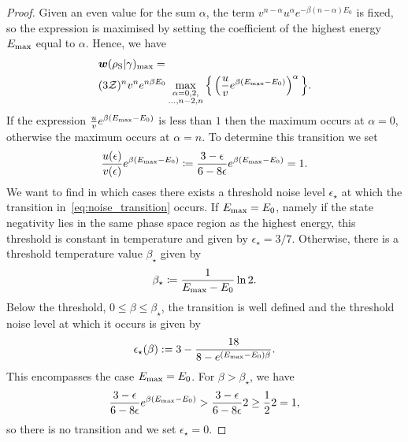 \documentclass[pra,
aps,
twocolumn,
superscriptaddress,
groupedaddress,
nofootinbib,
reprint
]{revtex4-1}
\begin{document}
\begin{proof}
Given an even value for the sum $\alpha$, the term $v^{n-\alpha} u^{\alpha} e^{-\beta (n-\alpha)E_0}$ is fixed, so the expression is maximised by setting the coefficient of the highest energy $E_{\rm{max}}$ equal to $\alpha$.
Hence, we have
\begin{align}
	&\bm{w}(\rho_{\rm{S}} | \gamma)_{\rm{max}} = \nonumber\\
	&(3\mathcal{Z})^{n} v^n e^{n\beta E_0}\max\limits_{\substack{\alpha = 0,2, \\ \dots,n-2,n}}{\Big\{ \left( \frac{u}{v} e^{\beta (E_{\rm{max}} - E_0)} \right)^{\alpha} \Big\}}.
\end{align}
If the expression $\frac{u}{v} e^{\beta (E_{\rm{max}} - E_0)}$ is less than $1$ then the maximum occurs at $\alpha=0$, otherwise the maximum occurs at $\alpha = n$. To determine this transition we set
\begin{equation}\label{eq:noise_transition}
	\frac{u(\epsilon)}{v(\epsilon)} e^{\beta (E_{\rm{max}} - E_0)} \coloneqq \frac{3-\epsilon}{6-8\epsilon} e^{\beta (E_{\rm{max}} - E_0)} = 1.
\end{equation}
We want to find in which cases there exists a threshold noise level $\epsilon_\star$ at which the transition in~\cref{eq:noise_transition} occurs.
If $E_{\rm{max}} = E_0$, namely if the state negativity lies in the same phase space region as the highest energy, this threshold is constant in temperature and given by $\epsilon_{\star} = 3/7$. 
Otherwise, there is a threshold temperature value $\beta_\star$ given by
\begin{equation}
	\beta_{\star} \coloneqq \frac{1}{E_{\rm{max}} - E_0} \ln2.
\end{equation}
Below the threshold, $0 \leq \beta \leq \beta_\star$, the transition is well defined and the threshold noise level at which it occurs is given by
\begin{equation}
	\epsilon_{\star}(\beta) := 3 - \dfrac{18}{8-e^{(E_{\rm{max}} - E_0)\beta}}.
\end{equation}
This encompasses the case $E_{\rm{max}} = E_0$.
For $\beta > \beta_\star$, we have
\begin{equation*}
	\frac{3-\epsilon}{6-8\epsilon} e^{\beta (E_{\rm{max}} - E_0)} > \frac{3-\epsilon}{6-8\epsilon} 2 \geq \frac{1}{2}2 = 1,
\end{equation*}
so there is no transition and we set $\epsilon_\star = 0$.


\end{proof}
\end{document}
